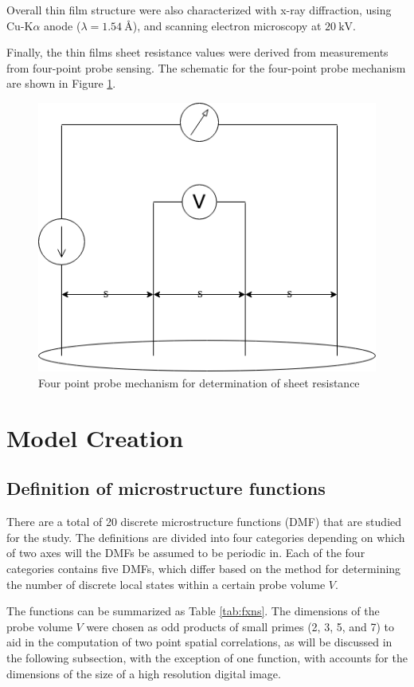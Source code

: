 Overall thin film structure were also characterized with x-ray diffraction, using Cu-K$\alpha$ anode ($\lambda = \SI{1.54}{\angstrom}$), and scanning electron microscopy at $\SI{20}{\kilo\V}$.

Finally, the thin films sheet resistance values were derived from measurements from four-point probe sensing.
The schematic for the four-point probe mechanism are shown in Figure \ref{fig:fpt}.

\begin{figure}
  \centering
  \includegraphics[scale=0.3]{FourPoint}
  \caption{Four point probe mechanism for determination of sheet resistance}
  \label{fig:fpt}
\end{figure}

\section{Model Creation}
\subsection{Definition of microstructure functions}
There are a total of 20 discrete microstructure functions (DMF) that are studied for the study.
The definitions are divided into four categories depending on which of two axes will the DMFs be assumed to be periodic in.
Each of the four categories contains five DMFs, which differ based on the method for determining the number of discrete local states within a certain probe volume $V$.

The functions can be summarized as Table \ref{tab:fxns}.
The dimensions of the probe volume $V$ were chosen as odd products of small primes (2, 3, 5, and 7) to aid in the computation of two point spatial correlations, as will be discussed in the following subsection, with the exception of one function, with accounts for the dimensions of the size of a high resolution digital image.

